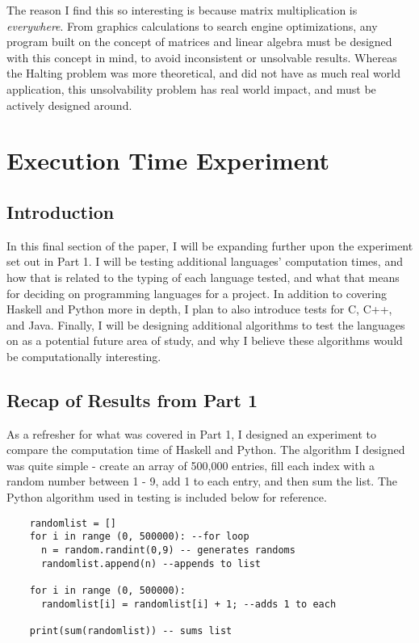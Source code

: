 \documentclass{article}
\begin{document}
    \medskip\noindent The reason I find this so interesting is because matrix multiplication is \textit{everywhere}. From graphics calculations to search engine optimizations, any program built on the concept of matrices and linear algebra must be designed with this concept in mind, to avoid inconsistent or unsolvable results. Whereas the Halting problem was more theoretical, and did not have as much real world application, this unsolvability problem has real world impact, and must be actively designed around. 
    
\section{Execution Time Experiment}
    \subsection{Introduction}
    \medskip\noindent In this final section of the paper, I will be expanding further upon the experiment set out in Part 1. I will be testing additional languages' computation times, and how that is related to the typing of each language tested, and what that means for deciding on programming languages for a project. In addition to covering Haskell and Python more in depth, I plan to also introduce tests for C, C++, and Java. Finally, I will be designing additional algorithms to test the languages on as a potential future area of study, and why I believe these algorithms would be computationally interesting.  
    
    \subsection{Recap of Results from Part 1}
    \medskip\noindent As a refresher for what was covered in Part 1, I designed an experiment to compare the computation time of Haskell and Python. The algorithm I designed was quite simple - create an array of 500,000 entries, fill each index with a random number between 1 - 9, add 1 to each entry, and then sum the list. The Python algorithm used in testing is included below for reference.
    
         \begin{lstlisting}
    randomlist = []
    for i in range (0, 500000): --for loop
      n = random.randint(0,9) -- generates randoms
      randomlist.append(n) --appends to list
    
    for i in range (0, 500000):
      randomlist[i] = randomlist[i] + 1; --adds 1 to each
    
    print(sum(randomlist)) -- sums list

    \end{lstlisting}
    
\end{document}
